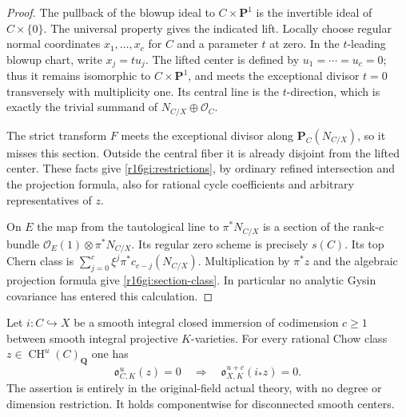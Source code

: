 \begin{proof}
The pullback of the blowup ideal to $C\times\mathbf P^1$ is the
invertible ideal of $C\times\{0\}$.  The universal property gives
the indicated lift.  Locally choose regular normal coordinates
$x_1,\ldots,x_c$ for $C$ and a parameter $t$ at zero.  In the
$t$-leading blowup chart, write $x_j=t u_j$.  The lifted center is
defined by $u_1=\cdots=u_c=0$; thus it remains isomorphic to
$C\times\mathbf P^1$, and meets the exceptional divisor $t=0$
transversely with multiplicity one.  Its central line is the
$t$-direction, which is exactly the trivial summand of
$N_{C/X}\oplus\mathcal O_C$.

The strict transform $F$ meets the exceptional divisor along
$\mathbf P_C(N_{C/X})$, so it misses this section.  Outside the
central fiber it is already disjoint from the lifted center.
These facts give \eqref{r16gi:restrictions}, by ordinary refined
intersection and the projection formula, also for rational cycle
coefficients and arbitrary representatives of $z$.

On $E$ the map from the tautological line to $\pi^*N_{C/X}$ is a
section of the rank-$c$ bundle
$\mathcal O_E(1)\otimes\pi^*N_{C/X}$.  Its regular zero scheme
is precisely $s(C)$.  Its top Chern class is
$\sum_{j=0}^c\xi^j\pi^*c_{c-j}(N_{C/X})$.
Multiplication by $\pi^*z$ and the algebraic projection formula
give \eqref{r16gi:section-class}.  In particular no analytic
Gysin covariance has entered this calculation.
\end{proof}

\begin{theorem}
\label{r16gi:kernel}
Let $i:C\hookrightarrow X$ be a smooth integral closed immersion
of codimension $c\geq1$ between smooth integral projective
$K$-varieties.  For every rational Chow class
$z\in\operatorname{CH}^u(C)_{\mathbf Q}$ one has
\[
 \mathfrak o_{C,K}^u(z)=0
 \quad\Longrightarrow\quad
 \mathfrak o_{X,K}^{u+c}(i_*z)=0.
 \tag{GI16.5}\label{r16gi:kernel-stability}
\]
The assertion is entirely in the original-field actual theory,
with no degree or dimension restriction.  It holds componentwise
for disconnected smooth centers.
\end{theorem}

